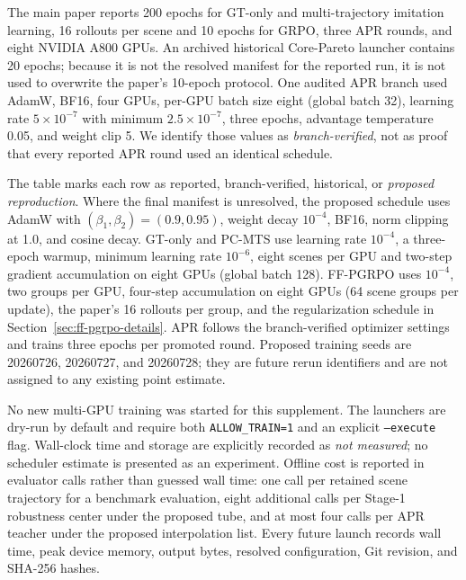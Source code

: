 The main paper reports 200 epochs for GT-only and multi-trajectory imitation
learning, 16 rollouts per scene and 10 epochs for GRPO, three APR rounds, and
eight NVIDIA A800 GPUs.  An archived historical Core-Pareto launcher contains
20 epochs; because it is not the resolved manifest for the reported run, it is
not used to overwrite the paper's 10-epoch protocol.  One audited APR branch
used AdamW, BF16, four GPUs, per-GPU batch size eight (global batch 32), learning
rate $5\times10^{-7}$ with minimum $2.5\times10^{-7}$, three epochs, advantage
temperature 0.05, and weight clip 5.  We identify those values as
\emph{branch-verified}, not as proof that every reported APR round used an
identical schedule.

The table marks each row as reported, branch-verified, historical, or
\emph{proposed reproduction}.  Where the final manifest is unresolved, the
proposed schedule uses AdamW with $(\beta_1,\beta_2)=(0.9,0.95)$, weight decay
$10^{-4}$, BF16, norm clipping at 1.0, and cosine decay.  GT-only and PC-MTS use
learning rate $10^{-4}$, a three-epoch warmup, minimum learning rate $10^{-6}$,
eight scenes per GPU and two-step gradient accumulation on eight GPUs (global
batch 128).  FF-PGRPO uses $10^{-4}$, two groups per GPU, four-step
accumulation on eight GPUs (64 scene groups per update), the paper's 16
rollouts per group, and the regularization schedule in
Section~\ref{sec:ff-pgrpo-details}.  APR follows the branch-verified optimizer
settings and trains three epochs per promoted round.  Proposed training seeds
are 20260726, 20260727, and 20260728; they are future rerun identifiers and are not assigned
to any existing point estimate.



No new multi-GPU training was started for this supplement.  The launchers are
dry-run by default and require both \texttt{ALLOW\_TRAIN=1} and an explicit
\texttt{--execute} flag.  Wall-clock time and
storage are explicitly recorded as \emph{not measured}; no scheduler estimate
is presented as an experiment.  Offline cost is reported in evaluator calls
rather than guessed wall
time: one call per retained scene trajectory for a benchmark evaluation, eight
additional calls per Stage-1 robustness center under the proposed tube, and at
most four calls per APR teacher under the proposed interpolation list.  Every
future launch records wall time, peak device memory, output bytes, resolved
configuration, Git revision, and SHA-256 hashes.

